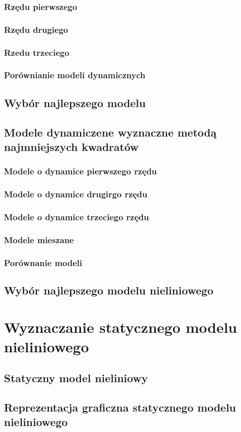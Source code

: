 \documentclass[a4paper, 11pt]{article}
\begin{document}
\subsubsection{Rzędu pierwszego}
\subsubsection{Rzędu drugiego}
\subsubsection{Rzedu trzeciego}
\subsubsection{Porównianie modeli dynamicznych}
\subsection{Wybór najlepszego modelu}
\subsection{Modele dynamiczene wyznaczne metodą najmniejszych kwadratów} 
\subsubsection{Modele o dynamice pierwszego rzędu}
\subsubsection{Modele o dynamice drugirgo rzędu}
\subsubsection{Modele o dynamice trzeciego rzędu}
\subsubsection{Modele mieszane}
\subsubsection{Porównanie modeli} %
\subsection{Wybór najlepszego modelu nieliniowego}


\section{Wyznaczanie statycznego modelu nieliniowego}
\subsection{Statyczny model nieliniowy}
\subsection{Reprezentacja graficzna statycznego modelu nieliniowego}
\end{document}
